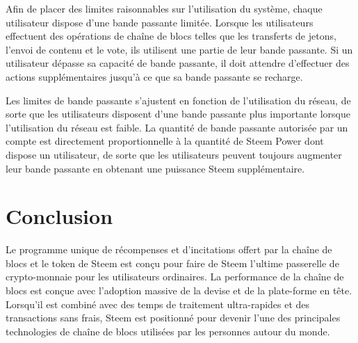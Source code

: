 \documentclass[11pt]{article}
\begin{document}
Afin de placer des limites raisonnables sur l'utilisation du
système, chaque utilisateur dispose d'une bande passante
limitée. Lorsque les utilisateurs effectuent des opérations de
chaîne de blocs telles que les transferts de jetons, l'envoi de
contenu et le vote, ils utilisent une partie de leur bande
passante. Si un utilisateur dépasse sa capacité de bande passante,
il doit attendre d'effectuer des actions supplémentaires jusqu'à ce
que sa bande passante se recharge.

Les limites de bande passante s'ajustent en fonction de
l'utilisation du réseau, de sorte que les utilisateurs disposent
d'une bande passante plus importante lorsque l'utilisation du
réseau est faible. La quantité de bande passante autorisée par un
compte est directement proportionnelle à la quantité de Steem Power
dont dispose un utilisateur, de sorte que les utilisateurs peuvent
toujours augmenter leur bande passante en obtenant une puissance
Steem supplémentaire.
\section{Conclusion}
\label{sec:org8f11644}
Le programme unique de récompenses et d'incitations offert par la
chaîne de blocs et le token de Steem est conçu pour faire de Steem
l'ultime passerelle de crypto-monnaie pour les utilisateurs
ordinaires. La performance de la chaîne de blocs est conçue avec
l'adoption massive de la devise et de la plate-forme en
tête. Lorsqu'il est combiné avec des temps de traitement
ultra-rapides et des transactions sans frais, Steem est positionné
pour devenir l'une des principales technologies de chaîne de blocs
utilisées par les personnes autour du monde.
\end{document}
